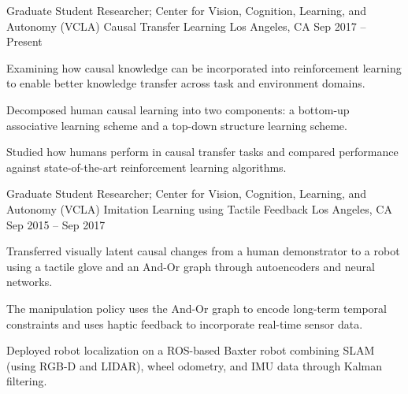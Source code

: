 


\begin{cventries}



\cventry
{Graduate Student Researcher; Center for Vision, Cognition, Learning, and Autonomy (VCLA)}
{Causal Transfer Learning}
{Los Angeles, CA}
{Sep 2017 – Present}
{
\begin{cvitems}
\item Examining how causal knowledge can be incorporated into reinforcement learning to enable better knowledge transfer across task and environment domains.
\item Decomposed human causal learning into two components: a bottom-up associative learning scheme and a top-down structure learning scheme.
\item Studied how humans perform in causal transfer tasks and compared performance against state-of-the-art reinforcement learning algorithms.
\end{cvitems}
}


\cventry
{Graduate Student Researcher; Center for Vision, Cognition, Learning, and Autonomy (VCLA)}
{Imitation Learning using Tactile Feedback}
{Los Angeles, CA}
{Sep 2015 – Sep 2017}
{
\begin{cvitems}
\item Transferred visually latent causal changes from a human demonstrator to a robot using a tactile glove and an And-Or graph through autoencoders and neural networks.
\item The manipulation policy uses the And-Or graph to encode long-term temporal constraints and uses haptic feedback to incorporate real-time sensor data.
\item Deployed robot localization on a ROS-based Baxter robot combining SLAM (using RGB-D and LIDAR), wheel odometry, and IMU data through Kalman filtering.
\end{cvitems}
}


\end{cventries}
